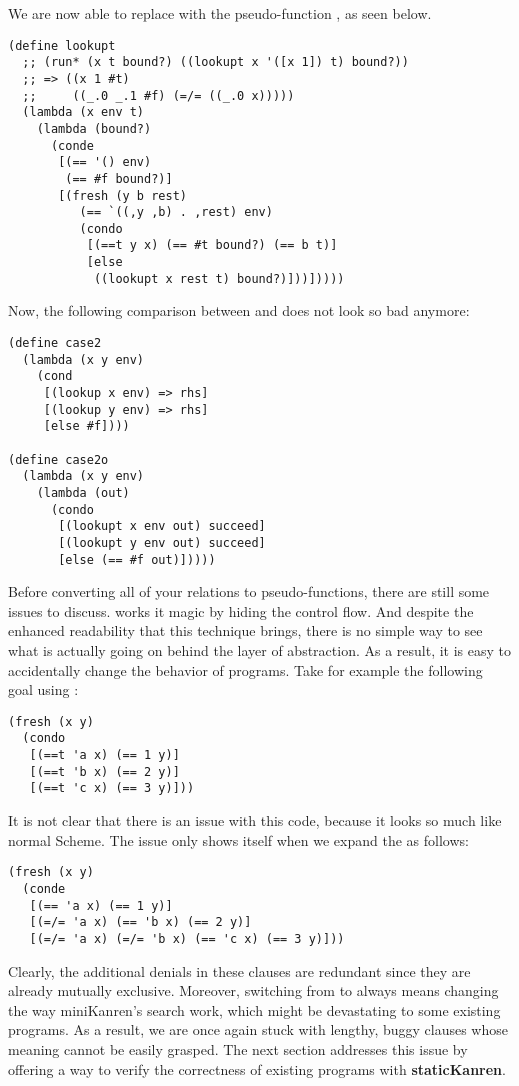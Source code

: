 We are now able to replace  with the pseudo-function , as seen below.
\begin{lstlisting}
(define lookupt
  ;; (run* (x t bound?) ((lookupt x '([x 1]) t) bound?))
  ;; => ((x 1 #t)
  ;;     ((_.0 _.1 #f) (=/= ((_.0 x)))))
  (lambda (x env t)
    (lambda (bound?)
      (conde
       [(== '() env)
        (== #f bound?)]
       [(fresh (y b rest)
          (== `((,y ,b) . ,rest) env)
          (condo
           [(==t y x) (== #t bound?) (== b t)]
           [else
            ((lookupt x rest t) bound?)]))]))))
\end{lstlisting}
Now, the following comparison between  and  does not look so bad anymore:
\begin{lstlisting}
(define case2
  (lambda (x y env)
    (cond
     [(lookup x env) => rhs]
     [(lookup y env) => rhs]
     [else #f])))

(define case2o
  (lambda (x y env)
    (lambda (out)
      (condo
       [(lookupt x env out) succeed]
       [(lookupt y env out) succeed]
       [else (== #f out)]))))
\end{lstlisting}

Before converting all of your relations to pseudo-functions, there are still some issues to discuss.  works it magic by hiding the control flow. And despite the enhanced readability that this technique brings, there is no simple way to see what is actually going on behind the layer of abstraction. As a result, it is easy to accidentally change the behavior of programs. Take for example the following goal using :
\begin{lstlisting}
(fresh (x y)
  (condo
   [(==t 'a x) (== 1 y)]
   [(==t 'b x) (== 2 y)]
   [(==t 'c x) (== 3 y)]))
\end{lstlisting}
It is not clear that there is an issue with this code, because it looks so much like normal Scheme. The issue only shows itself when we expand the  as follows:
\begin{lstlisting}
(fresh (x y)
  (conde
   [(== 'a x) (== 1 y)]
   [(=/= 'a x) (== 'b x) (== 2 y)]
   [(=/= 'a x) (=/= 'b x) (== 'c x) (== 3 y)]))
\end{lstlisting}
Clearly, the additional denials in these  clauses are redundant since they are already mutually exclusive. Moreover, switching from  to  always means changing the way miniKanren's search work, which might be devastating to some existing programs. As a result, we are once again stuck with lengthy, buggy  clauses whose meaning cannot be easily grasped. The next section addresses this issue by offering a way to verify the correctness of existing programs with \textbf{staticKanren}.